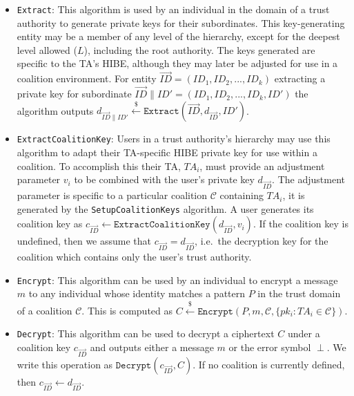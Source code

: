 \documentclass[10pt]{llncs}
\newcommand{\C}{\mathcal{C}}
\newcommand{\ID}{\mathit{ID}}
\newcommand{\TA}{\mathit{TA}}
\newcommand{\getsr}{\stackrel{{\scriptscriptstyle\$}}{\gets}}
\begin{document}
\begin{itemize}
\item \texttt{Extract}: This algorithm is used by an individual in
the domain of a trust authority to generate private keys for
their subordinates. This key-generating entity may be a member
of any level of the hierarchy, except for the deepest level
allowed ($L$), including the root authority. The keys generated
are specific to the TA's HIBE, although they may later be
adjusted for use in a coalition environment. For entity
$\vec{\ID} = (\ID_1, \ID_2, ..., \ID_k)$ extracting a private
key for subordinate $\vec{\ID}\|\ID' = (\ID_1, \ID_2, ...,
\ID_k, \ID')$ the algorithm outputs $d_{\vec{\ID}\|\ID'} \getsr
\texttt{Extract}(\vec{\ID},d_{\vec{\ID}}, \ID')$.
\medskip

\item \texttt{ExtractCoalitionKey}: Users in a trust authority's
hierarchy may use this algorithm to adapt their TA-specific HIBE
private key for use within a coalition. To accomplish this their
TA, $\TA_i$, must provide an adjustment parameter $v_i$ to be
combined with the user's private key $d_{\vec{\ID}}$. The
adjustment parameter is specific to a particular coalition $\C$
containing $\TA_i$, it is generated by the
\texttt{SetupCoalitionKeys} algorithm. A user generates its
coalition key as $c_{\vec{\ID}}\gets
\texttt{ExtractCoalitionKey}(d_{\vec{\ID}}, v_i)$. If the coalition
key is undefined, then we assume that $c_{\vec{\ID}} =
d_{\vec{\ID}}$, i.e.\ the decryption key for the coalition which
contains only the user's trust authority.
\medskip

\item \texttt{Encrypt}: This algorithm can be used by an individual
to encrypt a message $m$ to any individual whose identity
matches a pattern $P$ in the trust domain of a coalition $\C$.
This is computed as $C \getsr \texttt{Encrypt}(P,m,\C,\{pk_i :
\TA_i \in \C\})$.
\medskip

\item \texttt{Decrypt}: This algorithm can be used to decrypt a
ciphertext $C$ under a coalition key $c_{\vec{\ID}}$ and outputs
either a message $m$ or the error symbol $\perp$. We write this
operation as $\texttt{Decrypt}(c_{\vec{\ID}},C)$. If no
coalition is currently defined, then $c_{\vec{\ID}} \gets
d_{\vec{\ID}}$.
\end{itemize}
\end{document}
